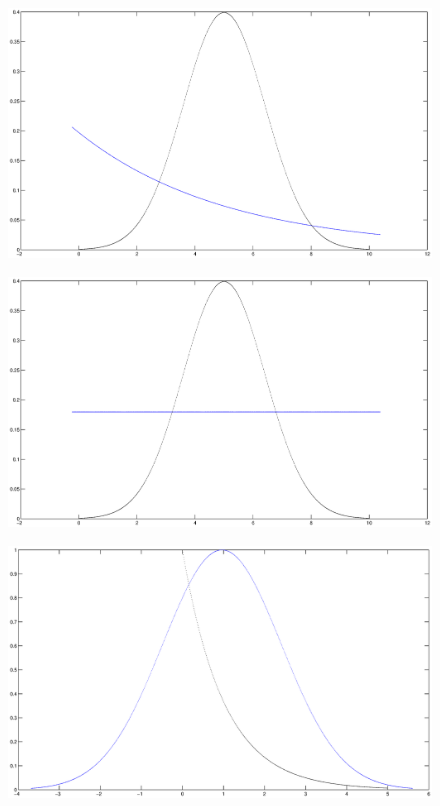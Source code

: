 \begin{figure}
\label{}
\includegraphics[scale=0.4]{gauss-exp}
\caption{}
\end{figure}

\begin{figure}
\label{}
\includegraphics[scale=0.4]{gauss-uni}
\caption{}
\end{figure}

\begin{figure}
\label{}
\includegraphics[scale=0.4]{exp-gauss}
\caption{}
\end{figure}

